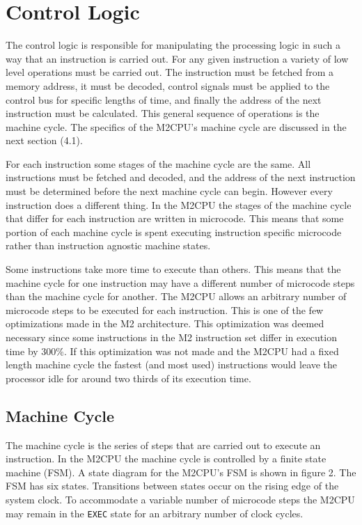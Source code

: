 \documentclass[a4paper,12pt]{article}
\newcommand{\mt}{M2CPU}
\newcommand{\mi}{M2 instruction set}
\newcommand{\ma}{M2 architecture}
\newcommand{\Ex}{\texttt{EXEC}}
\begin{document}
\newpage
\section{Control Logic}
The control logic is responsible for manipulating the processing logic in such
a way that an instruction is carried out. For any given instruction a variety
of low level operations must be carried out. The instruction must be fetched
from a memory address, it must be decoded, control signals must be applied to
the control bus for specific lengths of time, and finally the address of the
next instruction must be calculated. This general sequence of operations is the
machine cycle. The specifics of the \mt{}'s machine cycle are discussed in the 
next section (4.1).
\par

For each instruction some stages of the machine cycle are the same. All 
instructions must be fetched and decoded, and the address of the next 
instruction must be determined before the next machine cycle can begin. However
every instruction does a different thing. In the \mt{} the stages of the 
machine cycle that differ for each instruction are written in microcode. This
means that some portion of each machine cycle is spent executing instruction
specific microcode rather than instruction agnostic machine states.
\par

Some instructions take more time to execute than others. This means that the 
machine cycle for one instruction may have a different number of microcode 
steps than the machine cycle for another. The \mt{} allows an arbitrary number
of microcode steps to be executed for each instruction. This is one of the few
optimizations made in the \ma{}. This optimization was deemed necessary since
some instructions in the \mi{} differ in execution time by 300\%. If this
optimization was not made and the \mt{} had a fixed length machine cycle the
fastest (and most used) instructions would leave the processor idle for around
two thirds of its execution time.
\par

\subsection{Machine Cycle}
The machine cycle is the series of steps that are carried out to execute an
instruction. In the \mt{} the machine cycle is controlled by a finite state 
machine (FSM). A state diagram for the \mt{}'s FSM is shown in figure 2. The
FSM has six states. Transitions between states occur on the rising edge of the
system clock. To accommodate a variable number of microcode steps the \mt{} may
remain in the \Ex{} state for an arbitrary number of clock cycles. 
\par
\end{document}
